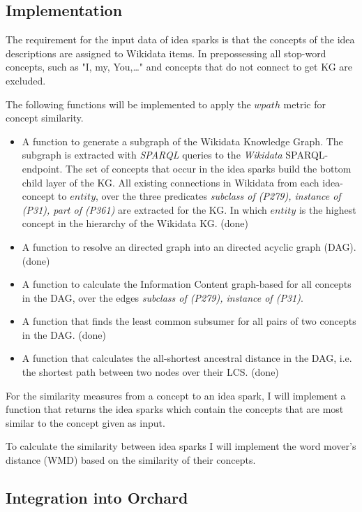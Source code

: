 \documentclass[pdftex,a4paper,12pt]{scrartcl}
\theoremstyle{definition}
\begin{document}
    \subsection{Implementation}
    
    The requirement for the input data of idea sparks is that the concepts of the idea descriptions are assigned to Wikidata items. In prepossessing all stop-word concepts, such as "I, my, You,\dots" and concepts that do not connect to get KG are excluded.
    
    The following functions will be implemented to apply the $wpath$ metric for concept similarity.
    \begin{itemize}
        \item A function to generate a subgraph of the Wikidata Knowledge Graph.
        The subgraph is extracted with \textit{SPARQL} queries to the \textit{Wikidata} SPARQL-endpoint. The set of concepts that occur in the idea sparks build the bottom child layer of the KG. All existing connections in Wikidata from each idea-concept to $entity$, over the three predicates \textit{subclass of (P279), instance of (P31), part of (P361)} are extracted for the KG. In which $entity$ is the highest concept in the hierarchy of the Wikidata KG. (done)
        \item A function to resolve an directed graph into an directed acyclic graph (DAG). (done)
        \item A function to calculate the Information Content graph-based for all concepts in the DAG, over the edges \textit{subclass of (P279), instance of (P31)}. 
        \item A function that finds the least common subsumer for all pairs of two concepts in the DAG. (done)
        \item A function that calculates the all-shortest ancestral distance in the DAG, i.e. the shortest path between two nodes over their LCS. (done)
    \end{itemize}
    
    For the similarity measures from a concept to an idea spark, I will implement a function that returns the idea sparks which contain the concepts that are most similar to the concept given as input. 
    
    To calculate the similarity between idea sparks I will implement the word mover's distance (WMD) \citep{kusner_word_nodate} based on the similarity of their concepts. 
    
    \subsection{Integration into Orchard}
    
\end{document}
